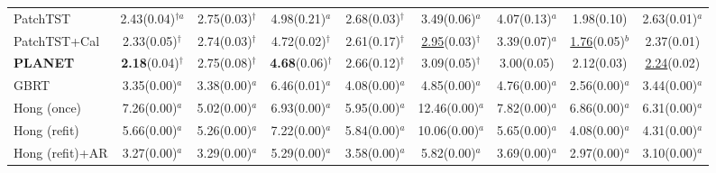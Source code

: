 \begin{table}[!t]
\begin{adjustbox}{max width=\linewidth}
\begin{tabular}{lcccccccc}
PatchTST & 2.43{\scriptsize\color{gray}(0.04)}$^{\dagger{}a}$ & 2.75{\scriptsize\color{gray}(0.03)}$^{\dagger{}}$ & 4.98{\scriptsize\color{gray}(0.21)}$^{a}$ & 2.68{\scriptsize\color{gray}(0.03)}$^{\dagger{}}$ & 3.49{\scriptsize\color{gray}(0.06)}$^{a}$ & 4.07{\scriptsize\color{gray}(0.13)}$^{a}$ & 1.98{\scriptsize\color{gray}(0.10)} & 2.63{\scriptsize\color{gray}(0.01)}$^{a}$ \\
PatchTST+Cal & 2.33{\scriptsize\color{gray}(0.05)}$^{\dagger{}}$ & 2.74{\scriptsize\color{gray}(0.03)}$^{\dagger{}}$ & 4.72{\scriptsize\color{gray}(0.02)}$^{\dagger{}}$ & 2.61{\scriptsize\color{gray}(0.17)}$^{\dagger{}}$ & \underline{2.95}{\scriptsize\color{gray}(0.03)}$^{\dagger{}}$ & 3.39{\scriptsize\color{gray}(0.07)}$^{a}$ & \underline{1.76}{\scriptsize\color{gray}(0.05)}$^{b}$ & 2.37{\scriptsize\color{gray}(0.01)} \\
\textbf{PLANET} & \textbf{2.18}{\scriptsize\color{gray}(0.04)}$^{\dagger{}}$ & 2.75{\scriptsize\color{gray}(0.08)}$^{\dagger{}}$ & \textbf{4.68}{\scriptsize\color{gray}(0.06)}$^{\dagger{}}$ & 2.66{\scriptsize\color{gray}(0.12)}$^{\dagger{}}$ & 3.09{\scriptsize\color{gray}(0.05)}$^{\dagger{}}$ & 3.00{\scriptsize\color{gray}(0.05)} & 2.12{\scriptsize\color{gray}(0.03)} & \underline{2.24}{\scriptsize\color{gray}(0.02)} \\
GBRT & 3.35{\scriptsize\color{gray}(0.00)}$^{a}$ & 3.38{\scriptsize\color{gray}(0.00)}$^{a}$ & 6.46{\scriptsize\color{gray}(0.01)}$^{a}$ & 4.08{\scriptsize\color{gray}(0.00)}$^{a}$ & 4.85{\scriptsize\color{gray}(0.00)}$^{a}$ & 4.76{\scriptsize\color{gray}(0.00)}$^{a}$ & 2.56{\scriptsize\color{gray}(0.00)}$^{a}$ & 3.44{\scriptsize\color{gray}(0.00)}$^{a}$ \\
Hong (once) & 7.26{\scriptsize\color{gray}(0.00)}$^{a}$ & 5.02{\scriptsize\color{gray}(0.00)}$^{a}$ & 6.93{\scriptsize\color{gray}(0.00)}$^{a}$ & 5.95{\scriptsize\color{gray}(0.00)}$^{a}$ & 12.46{\scriptsize\color{gray}(0.00)}$^{a}$ & 7.82{\scriptsize\color{gray}(0.00)}$^{a}$ & 6.86{\scriptsize\color{gray}(0.00)}$^{a}$ & 6.31{\scriptsize\color{gray}(0.00)}$^{a}$ \\
Hong (refit) & 5.66{\scriptsize\color{gray}(0.00)}$^{a}$ & 5.26{\scriptsize\color{gray}(0.00)}$^{a}$ & 7.22{\scriptsize\color{gray}(0.00)}$^{a}$ & 5.84{\scriptsize\color{gray}(0.00)}$^{a}$ & 10.06{\scriptsize\color{gray}(0.00)}$^{a}$ & 5.65{\scriptsize\color{gray}(0.00)}$^{a}$ & 4.08{\scriptsize\color{gray}(0.00)}$^{a}$ & 4.31{\scriptsize\color{gray}(0.00)}$^{a}$ \\
Hong (refit)+AR & 3.27{\scriptsize\color{gray}(0.00)}$^{a}$ & 3.29{\scriptsize\color{gray}(0.00)}$^{a}$ & 5.29{\scriptsize\color{gray}(0.00)}$^{a}$ & 3.58{\scriptsize\color{gray}(0.00)}$^{a}$ & 5.82{\scriptsize\color{gray}(0.00)}$^{a}$ & 3.69{\scriptsize\color{gray}(0.00)}$^{a}$ & 2.97{\scriptsize\color{gray}(0.00)}$^{a}$ & 3.10{\scriptsize\color{gray}(0.00)}$^{a}$ \\

\end{tabular}
\end{adjustbox}
\end{table}
